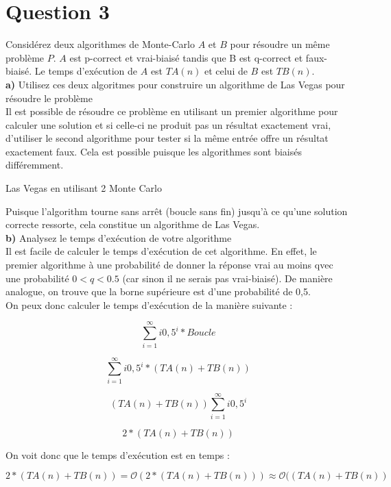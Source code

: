 \documentclass[devoir4.tex]{subfiles}
\begin{document}
\section*{Question 3}
Considérez deux algorithmes de Monte-Carlo \(A\) et \(B\) pour résoudre un même problème \(P\). \(A\) est p-correct et vrai-biaisé tandis que B est q-correct et faux-biaisé. Le temps d’exécution de \(A\) est \(TA(n)\) et celui de \(B\) est \(TB(n)\). \\

\textbf{a)} Utilisez ces deux algoritmes pour construire un algorithme de Las Vegas pour résoudre le problème \\

Il est possible de résoudre ce problème en utilisant un premier algorithme pour calculer une solution et si celle-ci ne produit pas un résultat exactement vrai, d'utiliser le second algorithme pour tester si la même entrée offre un résultat exactement faux. Cela est possible puisque les algorithmes sont biaisés différemment.  \\

\begin{algorithm}[H]

  {
	}

  \caption{Las Vegas en utilisant 2 Monte Carlo}
\end{algorithm}

\hfill \break Puisque l'algorithm tourne sans arrêt (boucle sans fin) jusqu'à ce qu'une solution correcte ressorte, cela constitue un algorithme de Las Vegas. \\

\textbf{b)} Analysez le temps d'exécution de votre algorithme \\

Il est facile de calculer le temps d'exécution de cet algorithme. En effet, le premier algorithme à une probabilité de donner la réponse vrai au moins qvec une probabilité \( 0 < q < 0.5 \) (car sinon il ne serais pas vrai-biaisé). De manière analogue, on trouve que la borne supérieure est d'une probabilité de 0,5. \\

On peux donc calculer le temps d'exécution de la manière suivante :

\[ \sum_{i=1}^{\infty} {i 0,5^i * Boucle} \]

\[ \sum_{i=1}^{\infty} {i 0,5^i * (TA(n) + TB(n))} \]

\[ (TA(n) + TB(n)) \sum_{i=1}^{\infty} {i 0,5^i} \]

\[ 2 * (TA(n) + TB(n)) \]

\hfill \break On voit donc que le temps d'exécution est en temps :

\[ 2 * (TA(n) + TB(n)) = \mathcal{O}(2 * (TA(n) + TB(n))) \approx \mathcal{O}((TA(n) + TB(n)) \]
\end{document}
